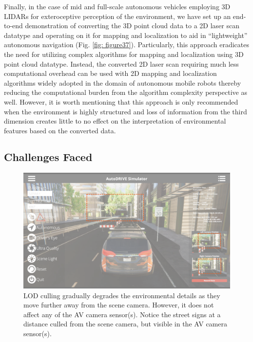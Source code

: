 Finally, in the case of mid and full-scale autonomous vehicles employing 3D LIDARs for exteroceptive perception of the environment, we have set up an end-to-end demonstration of converting the 3D point cloud data to a 2D laser scan datatype and operating on it for mapping and localization to aid in “lightweight” autonomous navigation (Fig. \ref{fig: figure37}). Particularly, this approach eradicates the need for utilizing complex algorithms for mapping and localization using 3D point cloud datatype. Instead, the converted 2D laser scan requiring much less computational overhead can be used with 2D mapping and localization algorithms widely adopted in the domain of autonomous mobile robots thereby reducing the computational burden from the algorithm complexity perspective as well. However, it is worth mentioning that this approach is only recommended when the environment is highly structured and loss of information from the third dimension creates little to no effect on the interpretation of environmental features based on the converted data.

\hypertarget{Challenges Faced}{%
\subsection{Challenges Faced}\label{Challenges Faced}}

\begin{figure}[t]
    \centering
    \includegraphics[width=\linewidth]{Figures/fig38.png}
    \caption{LOD culling gradually degrades the environmental details as they move further away from the scene camera. However, it does not affect any of the AV camera sensor(s). Notice the street signs at a distance culled from the scene camera, but visible in the AV camera sensor(s).}
    \label{fig: figure38}
\end{figure}

